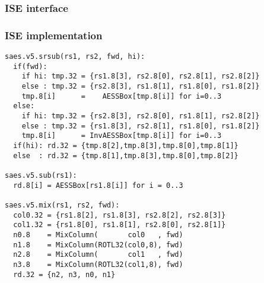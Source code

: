 
\subsubsection{ISE interface}



\subsubsection{ISE implementation}

\begin{lstlisting}[language=pseudo,style=block]
saes.v5.srsub(rs1, rs2, fwd, hi):
  if(fwd):
    if hi: tmp.32 = {rs1.8[3], rs2.8[0], rs2.8[1], rs2.8[2]}
    else : tmp.32 = {rs2.8[3], rs1.8[1], rs1.8[0], rs1.8[2]}
    tmp.8[i]      =    AESSBox[tmp.8[i]] for i=0..3
  else:
    if hi: tmp.32 = {rs2.8[3], rs2.8[0], rs1.8[1], rs2.8[2]}
    else : tmp.32 = {rs1.8[3], rs2.8[1], rs1.8[0], rs1.8[2]}
    tmp.8[i]      = InvAESSBox[tmp.8[i]] for i=0..3
  if(hi): rd.32 = {tmp.8[2],tmp.8[3],tmp.8[0],tmp.8[1]}
  else  : rd.32 = {tmp.8[1],tmp.8[3],tmp.8[0],tmp.8[2]}

saes.v5.sub(rs1):
  rd.8[i] = AESSBox[rs1.8[i]] for i = 0..3

saes.v5.mix(rs1, rs2, fwd):
  col0.32 = {rs1.8[2], rs1.8[3], rs2.8[2], rs2.8[3]}
  col1.32 = {rs1.8[0], rs1.8[1], rs2.8[0], rs2.8[1]}
  n0.8    = MixColumn(       col0   , fwd)
  n1.8    = MixColumn(ROTL32(col0,8), fwd)
  n2.8    = MixColumn(       col1   , fwd)
  n3.8    = MixColumn(ROTL32(col1,8), fwd)
  rd.32 = {n2, n3, n0, n1}
\end{lstlisting}


